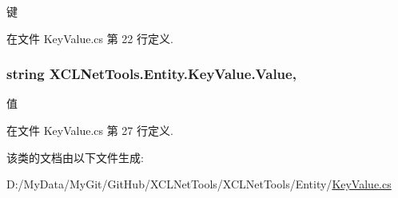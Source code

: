 键 



在文件 Key\-Value.\-cs 第 22 行定义.

\hypertarget{class_x_c_l_net_tools_1_1_entity_1_1_key_value_a9ec3c76143930f64c1e0de2074514bae}{
\subsubsection[{Value}]{\setlength{\rightskip}{0pt plus 5cm}string X\-C\-L\-Net\-Tools.\-Entity.\-Key\-Value.\-Value\hspace{0.3cm}{\ttfamily [get]}, {\ttfamily [set]}}}\label{class_x_c_l_net_tools_1_1_entity_1_1_key_value_a9ec3c76143930f64c1e0de2074514bae}


值 



在文件 Key\-Value.\-cs 第 27 行定义.



该类的文档由以下文件生成\-:\begin{DoxyCompactItemize}
\item 
D\-:/\-My\-Data/\-My\-Git/\-Git\-Hub/\-X\-C\-L\-Net\-Tools/\-X\-C\-L\-Net\-Tools/\-Entity/\hyperlink{_key_value_8cs}{Key\-Value.\-cs}\end{DoxyCompactItemize}
